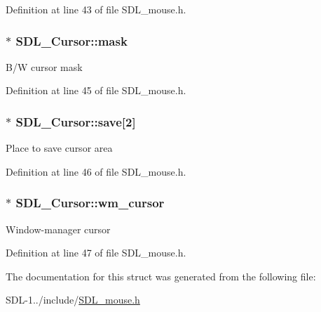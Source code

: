 Definition at line 43 of file S\+D\+L\+\_\+mouse.\+h.

\hypertarget{struct_s_d_l___cursor_afaec3f604b8a83986bab02eee024c5eb}{}
\subsubsection[{mask}]{$\ast$ S\+D\+L\+\_\+\+Cursor\+::mask}\label{struct_s_d_l___cursor_afaec3f604b8a83986bab02eee024c5eb}
B/\+W cursor mask 

Definition at line 45 of file S\+D\+L\+\_\+mouse.\+h.

\hypertarget{struct_s_d_l___cursor_a44a8edebf057e76e048512a57c5630e0}{}
\subsubsection[{save}]{$\ast$ S\+D\+L\+\_\+\+Cursor\+::save\mbox{[}2\mbox{]}}\label{struct_s_d_l___cursor_a44a8edebf057e76e048512a57c5630e0}
Place to save cursor area 

Definition at line 46 of file S\+D\+L\+\_\+mouse.\+h.

\hypertarget{struct_s_d_l___cursor_ab133c48a66abe3831e5ad18467d9ef3d}{}
\subsubsection[{wm\+\_\+cursor}]{$\ast$ S\+D\+L\+\_\+\+Cursor\+::wm\+\_\+cursor}\label{struct_s_d_l___cursor_ab133c48a66abe3831e5ad18467d9ef3d}
Window-\/manager cursor 

Definition at line 47 of file S\+D\+L\+\_\+mouse.\+h.



The documentation for this struct was generated from the following file\+:\begin{DoxyCompactItemize}
\item 
S\+D\+L-\/1../include/\hyperlink{_s_d_l__mouse_8h}{S\+D\+L\+\_\+mouse.\+h}\end{DoxyCompactItemize}
